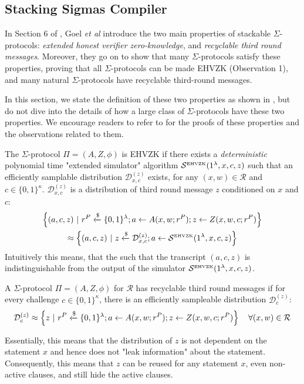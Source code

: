 \subsection{Stacking Sigmas Compiler}
In Section 6 of \cite{StackingSigmas}, Goel \emph{et al} introduce the two main properties of stackable $\Sigma$-protocols: \textit{extended honest verifier 
zero-knowledge}, and \textit{recyclable third round messages}. Moreover, they go on to show that many $\Sigma$-protocols satisfy these properties, 
proving that all $\Sigma$-protocols can be made EHVZK (Observation 1), and many natural $\Sigma$-protocols have recyclable third-round messages. 

In this section, we state the definition of these two properties as shown in \cite{StackingSigmas}, but do not dive into the details of how a large class of 
$\Sigma$-protocols have these two properties. We encourage readers to refer to \cite{StackingSigmas} for the proofs of these properties and the observations 
related to them.

\begin{definition}
  The $\Sigma$-protocol $\Pi = (A, Z, \phi)$ is EHVZK if there exists a \textit{deterministic} polynomial time "extended simulator" algorithm 
  $\mathcal S^{\text{\tiny EHVZK}}(1^\lambda, x, c, z)$ such that an efficiently samplable distribution 
  $\mathcal D_{x,c}^{(z)}$ exists, for any $(x,w) \in \mathcal R$ and $c \in \{0,1\}^\kappa$. 
  $\mathcal D_{x,c}^(z)$ is a distribution of third round message $z$ conditioned on $x$ and $c$:
  \begin{multline*}
    \left\{
      (a,c,z) \ \vert\  r^P \xleftarrow{\$} \{0,1\}^\lambda; a \leftarrow A(x, w; r^P); z \leftarrow Z(x,w,c; r^P)
    \right\} \\
    \approx
    \left\{
      (a,c,z) \ \vert\  z \xleftarrow{\$} \mathcal D_{x,c}^{(z)}; a \leftarrow \mathcal S^{\text{\tiny EHVZK}}(1^\lambda, x, c, z)
    \right\}
  \end{multline*}
  Intuitively this means, that the such that the transcript $(a,c,z)$ is indistinguishable from the output of the simulator
  $\mathcal S^{\text{\tiny EHVZK}}(1^\lambda, x, c, z)$.
\end{definition}

\begin{definition}
  A $\Sigma$-protocol $\Pi = (A, Z, \phi)$ for $\mathcal R$ has recyclable third round messages if for every challenge $c \in \{0,1\}^\kappa$, there is an 
  efficiently sampleable distribution $\mathcal D_c^{(z)}$:
  $$
    \mathcal D_c^{(z)} \approx \left\{z \ \vert\  r^P \xleftarrow{\$} \{0,1\}^\lambda; a \leftarrow A(x,w;r^P); z \leftarrow Z(x,w,c;r^P) \right\}\quad 
    \forall (x,w) \in \mathcal R 
  $$
\end{definition}
  Essentially, this means that the distribution of $z$ is not dependent on the statement $x$ and hence does not "leak information" about the statement. 
  Consequently, this means that $z$ can be reused for any statement $x$, even non-active clauses, and still hide the active clauses. 

